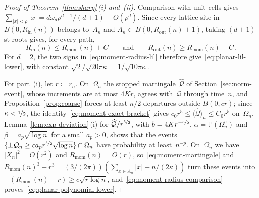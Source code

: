 \documentclass[11pt]{amsart}
\theoremstyle{plain}
\theoremstyle{definition}
\renewcommand{\P}{\mathbb P}
\newcommand{\drift}{\kappa}
\newcommand{\nf}{\nicefrac}
\newcommand{\Rin}{R_{\mathrm{in}}}
\newcommand{\Rout}{R_{\mathrm{out}}}
\newcommand{\Rmom}{R_{\mathrm{mom}}}
\numberwithin{equation}{section}
\begin{document}
\begin{proof}[Proof of Theorem~\ref{thm:sharp}\,\textup{(i)} and~\textup{(ii)}]
Comparison with unit cells gives $\sum_{|x|<\rho}|x|=d\omega_d\rho^{d+1}/(d+1)+O(\rho^d)$. Since every lattice site in $B(0,\Rin(n))$ belongs to~$A_n$ and $A_n\subset B(0,\Rout(n)+1)$, taking $(d+1)$st roots gives, for every path,
\begin{equation}\label{eq:moment-radius-comparison}
\Rin(n)\leq\Rmom(n)+C
\qquad\text{and}\qquad
\Rout(n)\geq\Rmom(n)-C\, .
\end{equation}
For $d=2$, the two signs in~\eqref{eq:moment-radius-lil} therefore give~\eqref{eq:planar-lil-lower}, with constant $\sqrt2/\sqrt{20\pi\drift}=1/\sqrt{10\pi\drift}$.

For part~(i), let $r\coloneqq r_n$. On~$\Omega_n$ the stopped martingale~$\widehat{\mathcal Q}$ of Section~\ref{sec:norm-event}, whose increments are at most $4Kr$, agrees with~$\mathcal Q$ through time~$n$, and Proposition~\ref{prop:coarse} forces at least $n/2$ departures outside $B(0,cr)$; since $\drift<\nf12$, the identity~\eqref{eq:moment-exact-bracket} gives $c_0r^5\leq\langle\widehat{\mathcal Q}\rangle_n\leq C_0r^5$ on~$\Omega_n$. Lemma~\ref{lem:exp-deviation}\,(i) for $\widehat{\mathcal Q}/r^{\nf52}$, with $b=4Kr^{-\nf32}$, $\alpha=\P(\Omega_n^c)$ and $\beta=a_p\sqrt{\log n}$ for a small $a_p>0$, shows that the events $\{\pm\mathcal Q_n\geq ca_pr^{\nf52}\sqrt{\log n}\}\cap\Omega_n$ have probability at least~$n^{-p}$. On~$\Omega_n$ we have $|X_n|^2=O(r^2)$ and $\Rmom(n)=O(r)$, so~\eqref{eq:moment-martingale} and $\Rmom(n)^3-r^3=(3/(2\pi))(\sum_{x\in A_n}|x|-n/(2\drift))$ turn these events into $\pm(\Rmom(n)-r)\geq c\sqrt{r\log n}$, and~\eqref{eq:moment-radius-comparison} proves~\eqref{eq:planar-polynomial-lower}.
\end{proof}
\end{document}
